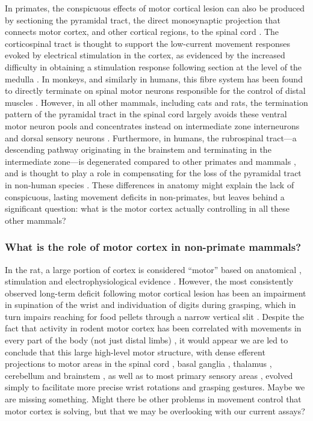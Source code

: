 In primates, the conspicuous effects of motor cortical lesion can also be produced by sectioning the pyramidal tract, the direct monosynaptic projection that connects motor cortex, and other cortical regions, to the spinal cord \cite{Tower1940,Lawrence1968}. The corticospinal tract is thought to support the low-current movement responses evoked by electrical stimulation in the cortex, as evidenced by the increased difficulty in obtaining a stimulation response following section at the level of the medulla \cite{Woolsey1972}. In monkeys, and similarly in humans, this fibre system has been found to directly terminate on spinal motor neurons responsible for the control of distal muscles \cite{Leyton1917,Bernhard1954}. However, in all other mammals, including cats and rats, the termination pattern of the pyramidal tract in the spinal cord largely avoids these ventral motor neuron pools and concentrates instead on intermediate zone interneurons and dorsal sensory neurons \cite{Kuypers1981,Yang2003}. Furthermore, in humans, the rubrospinal tract---a descending pathway originating in the brainstem and terminating in the intermediate zone---is degenerated compared to other primates and mammals \cite{Square1982}, and is thought to play a role in compensating for the loss of the pyramidal tract in non-human species \cite{Lawrence1968a,Zaaimi2012}. These differences in anatomy might explain the lack of conspicuous, lasting movement deficits in non-primates, but leaves behind a significant question: what is the motor cortex actually controlling in all these other mammals?

\subsubsection*{What is the role of motor cortex in non-primate mammals?}

In the rat, a large portion of cortex is considered ``motor'' based on anatomical \cite{Donoghue1982}, stimulation \cite{Donoghue1982,Neafsey1986} and electrophysiological evidence \cite{Hyland1998}. However, the most consistently observed long-term deficit following motor cortical lesion has been an impairment in supination of the wrist and individuation of digits during grasping, which in turn impairs reaching for food pellets through a narrow vertical slit \cite{Whishaw1991,Alaverdashvili2008a}. Despite the fact that activity in rodent motor cortex has been correlated with movements in every part of the body (not just distal limbs) \cite{Hill2011,Erlich2011}, it would appear we are led to conclude that this large high-level motor structure, with dense efferent projections to motor areas in the spinal cord \cite{Kuypers1981}, basal ganglia \cite{Turner2000,Wu2009}, thalamus \cite{Lee2008}, cerebellum \cite{Baker2001} and brainstem \cite{Jarratt1999}, as well as to most primary sensory areas \cite{Petreanu2012,Schneider2014}, evolved simply to facilitate more precise wrist rotations and grasping gestures. Maybe we are missing something. Might there be other problems in movement control that motor cortex is solving, but that we may be overlooking with our current assays?

